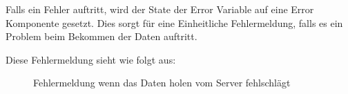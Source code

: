 \newpage
Falls ein Fehler auftritt, wird der State der Error Variable auf eine Error Komponente gesetzt. Dies
sorgt für eine Einheitliche Fehlermeldung, falls es ein Problem beim Bekommen der Daten auftritt.

Diese Fehlermeldung sieht wie folgt aus:
\begin{figure}[H]
    \begin{center}
      \caption{Fehlermeldung wenn das Daten holen vom Server fehlschlägt}
    \end{center}
  \end{figure}
  